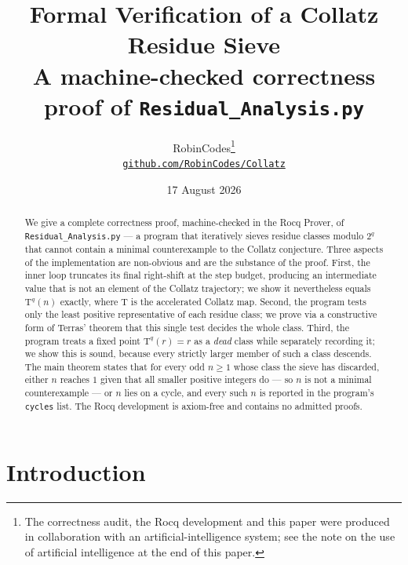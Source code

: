 \documentclass[11pt,a4paper]{article}
\theoremstyle{plain}
\theoremstyle{definition}
\newcommand{\Tmap}{\mathrm{T}}
\begin{document}
\title{\bf Formal Verification of a Collatz Residue Sieve\\[2mm]
\large A machine-checked correctness proof of \texttt{Residual\_Analysis.py}}

\author{RobinCodes\thanks{The correctness audit, the Rocq development and this paper were
produced in collaboration with an artificial-intelligence system; see the note on the use of
artificial intelligence at the end of this paper.}\\[1mm]
\small\href{https://github.com/RobinCodes/Collatz}{\texttt{github.com/RobinCodes/Collatz}}}

\date{17 August 2026}

\maketitle

\begin{abstract}
\noindent
We give a complete correctness proof, machine-checked in the Rocq Prover, of
\texttt{Residual\_Analysis.py} --- a program that iteratively sieves residue
classes modulo $2^q$ that cannot contain a minimal counterexample to the
Collatz conjecture. Three aspects of the implementation are non-obvious and
are the substance of the proof. First, the inner loop truncates its final
right-shift at the step budget, producing an intermediate value that is not an
element of the Collatz trajectory; we show it nevertheless equals
$\Tmap^{q}(n)$ exactly, where $\Tmap$ is the accelerated Collatz map. Second,
the program tests only the least positive representative of each residue
class; we prove via a constructive form of Terras' theorem that this single
test decides the whole class. Third, the program treats a fixed point
$\Tmap^{q}(r)=r$ as a \emph{dead} class while separately recording it; we show
this is sound, because every strictly larger member of such a class descends.
The main theorem states that for every odd $n \geq 1$ whose class the sieve has
discarded, either $n$ reaches $1$ given that all smaller positive integers do
--- so $n$ is not a minimal counterexample --- or $n$ lies on a cycle, and
every such $n$ is reported in the program's \texttt{cycles} list. The Rocq
development is axiom-free and contains no admitted proofs.
\end{abstract}

\section{Introduction}
\end{document}
